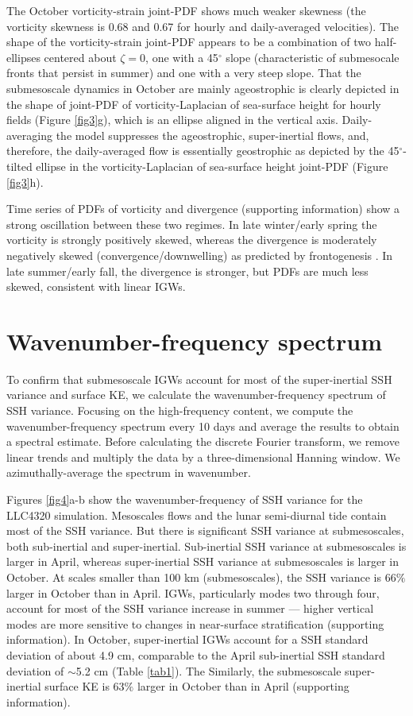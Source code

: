 \documentclass[grl]{agutex2015}
\begin{document}
\begin{article}
The October vorticity-strain joint-PDF shows much weaker skewness (the vorticity skewness
is 0.68 and 0.67 for hourly and daily-averaged velocities). The shape of the
vorticity-strain joint-PDF  appears to be a combination of two half-ellipses centered
about $\zeta=0$, one with a 45$^\circ$ slope (characteristic of submesocale fronts
that persist in summer) and one with a very steep slope.
That the submesoscale dynamics in October are mainly ageostrophic is clearly depicted
in the shape of joint-PDF of vorticity-Laplacian of sea-surface height for hourly fields
 (Figure \ref{fig3}g), which is an ellipse aligned in the vertical axis.
Daily-averaging the model suppresses the ageostrophic, super-inertial flows, and, therefore,
the daily-averaged flow is essentially geostrophic as depicted by the 45$^\circ$-tilted
ellipse in the vorticity-Laplacian of sea-surface height joint-PDF (Figure \ref{fig3}h).

 Time series of PDFs of vorticity and divergence (supporting information) show
 a strong oscillation between these two regimes. In late winter/early spring
 the vorticity is strongly positively skewed, whereas the divergence is moderately
 negatively skewed (convergence/downwelling) as predicted by frontogenesis \citep[e.g., ][]{mcwilliams2016}.
 In late summer/early fall, the divergence is stronger, but PDFs are much less skewed,
consistent with linear IGWs.

\section{Wavenumber-frequency spectrum}
To confirm that submesoscale IGWs account for most of the super-inertial SSH variance
and surface KE, we calculate the wavenumber-frequency spectrum of SSH variance. Focusing on
the high-frequency
content, we compute the wavenumber-frequency spectrum  every 10 days and average
the results to obtain a spectral estimate. Before calculating the discrete Fourier
transform, we
remove linear trends and multiply the data by a three-dimensional Hanning window.
We azimuthally-average the spectrum in wavenumber.

Figures \ref{fig4}a-b show the wavenumber-frequency of SSH variance for the LLC4320
simulation. Mesoscales flows and the lunar semi-diurnal tide contain most of the
SSH variance. But there is significant SSH variance at submesoscales, both sub-inertial
and super-inertial. Sub-inertial SSH variance at submesoscales is larger in April, whereas
super-inertial SSH variance at submesoscales is larger in October. At scales smaller
than 100 km (submesoscales), the SSH variance is 66$\%$ larger in October than in April.
IGWs, particularly modes two through four, account for most of the SSH variance
increase in summer --- higher vertical
modes are more sensitive to changes in near-surface stratification (supporting information).
In October, super-inertial IGWs account for a SSH standard deviation of about 4.9 cm,
comparable to the April sub-inertial SSH standard deviation of $\sim$5.2 cm (Table \ref{tab1}).
The
Similarly, the submesoscale super-inertial surface KE is 63$\%$ larger in October
than in April (supporting information).


\end{article}
\end{document}
